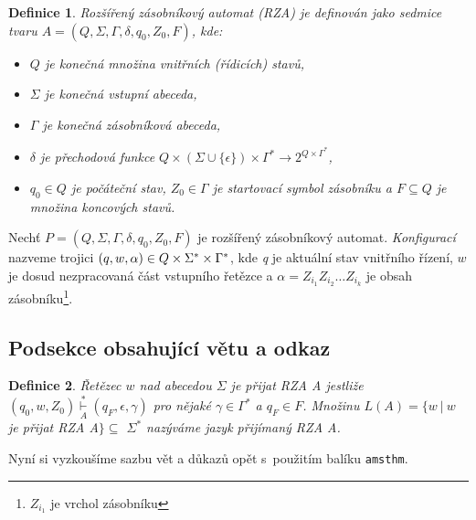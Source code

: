 \documentclass[a4paper, twocolumn, 11pt]{article}
\newtheorem{definition}{Definice}
\begin{document}
 \begin{definition}{\label{def1}}
    \emph{Rozšířený zásobníkový automat} (RZA) je definován jako sedmice tvaru
    $A = (Q,\Sigma,\Gamma,\delta,q_0,Z_0,F)$, kde: 
    \begin{itemize}
        \item $Q$ \emph{je konečná množina} \emph{vnitřních (řídicích) stavů},
        
        \item ${\Sigma}$ je konečná \emph{vstupní abeceda},
        
        \item ${\Gamma}$ je konečná \emph{zásobníková abeceda},
        
        \item ${\delta}$ je \emph{přechodová funkce} $Q\times(\Sigma\!\cup\!\{\epsilon\})\times\Gamma^*\rightarrow2^{Q\times\Gamma^*}$,
        
        \item $q_0 \in Q$ je \emph{počáteční stav,} $Z_0 \in \Gamma$ je \emph{startovací symbol zásobníku} a $F \subseteq Q$ je množina \emph{koncových stavů.}
    \end{itemize}
 \end{definition}
 
 Nechť $P=(Q,\Sigma,\Gamma,\delta,q_0,Z_0,F)$ je rozšířený zásobníkový automat. \emph{Konfigurací} nazveme trojici $(q,w,\alpha) \in {\fontfamily{pzc} Q}\times\Sigma^*\times\Gamma^*$, kde \emph{q} je aktuální stav vnitřního řízení, $w$ je dosud nezpracovaná část vstupního řetězce a 
 $\alpha = Z_{i_1}Z_{i_2}\dots Z_{i_k}$ je obsah zásobníku\footnote{$Z_{i_1}$ je vrchol zásobníku}.
 
 \subsection{Podsekce obsahující větu a odkaz}
 
 \begin{definition}{\label{def2}}
 \emph{Řetězec} $w$ \emph{nad abecedou} $\Sigma$ \emph{je přijat RZA} A jestliže 
 $(q_0,w,Z_0) \overset{*}{\underset{A}{\vdash}} (q_F,\epsilon,\gamma)$ pro nějaké 
 $\gamma \in \Gamma^*$ a $q_F \in F$. Množinu $L(A) = \{w \ | \ w$ je přijat RZA A$\} \subseteq$ $\Sigma^*$ nazýváme \emph{jazyk přijímaný RZA} A.
 \end{definition}
 
 Nyní si vyzkoušíme sazbu vět a důkazů opět s~použitím balíku \texttt{amsthm}.   
\end{document}
